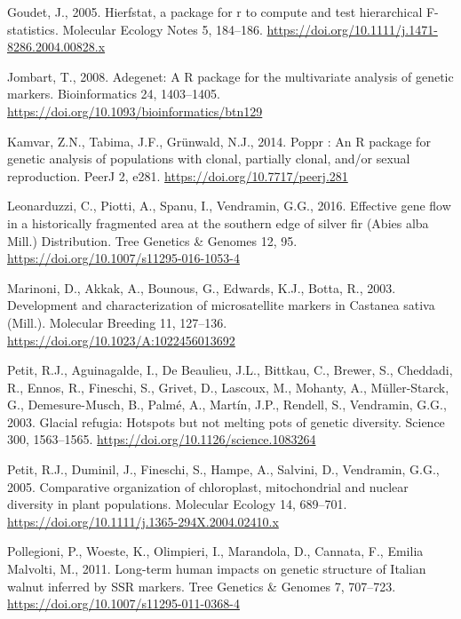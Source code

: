 \documentclass[12pt,a4paper,]{report}
\begin{document}
\hypertarget{refs}{}
\leavevmode\hypertarget{ref-goudet_hierfstat_2005}{}%
Goudet, J., 2005. Hierfstat, a package for r to compute and test
hierarchical F-statistics. Molecular Ecology Notes 5, 184--186.
\url{https://doi.org/10.1111/j.1471-8286.2004.00828.x}

\leavevmode\hypertarget{ref-Jombart2008}{}%
Jombart, T., 2008. Adegenet: A R package for the multivariate analysis
of genetic markers. Bioinformatics 24, 1403--1405.
\url{https://doi.org/10.1093/bioinformatics/btn129}

\leavevmode\hypertarget{ref-Kamvar2014}{}%
Kamvar, Z.N., Tabima, J.F., Grünwald, N.J., 2014. Poppr : An R package
for genetic analysis of populations with clonal, partially clonal,
and/or sexual reproduction. PeerJ 2, e281.
\url{https://doi.org/10.7717/peerj.281}

\leavevmode\hypertarget{ref-Leonarduzzi2016a}{}%
Leonarduzzi, C., Piotti, A., Spanu, I., Vendramin, G.G., 2016. Effective
gene flow in a historically fragmented area at the southern edge of
silver fir (Abies alba Mill.) Distribution. Tree Genetics \& Genomes 12,
95. \url{https://doi.org/10.1007/s11295-016-1053-4}

\leavevmode\hypertarget{ref-marinoni_development_2003}{}%
Marinoni, D., Akkak, A., Bounous, G., Edwards, K.J., Botta, R., 2003.
Development and characterization of microsatellite markers in Castanea
sativa (Mill.). Molecular Breeding 11, 127--136.
\url{https://doi.org/10.1023/A:1022456013692}

\leavevmode\hypertarget{ref-Petit2003}{}%
Petit, R.J., Aguinagalde, I., De Beaulieu, J.L., Bittkau, C., Brewer,
S., Cheddadi, R., Ennos, R., Fineschi, S., Grivet, D., Lascoux, M.,
Mohanty, A., Müller-Starck, G., Demesure-Musch, B., Palmé, A., Martín,
J.P., Rendell, S., Vendramin, G.G., 2003. Glacial refugia: Hotspots but
not melting pots of genetic diversity. Science 300, 1563--1565.
\url{https://doi.org/10.1126/science.1083264}

\leavevmode\hypertarget{ref-Petit2005}{}%
Petit, R.J., Duminil, J., Fineschi, S., Hampe, A., Salvini, D.,
Vendramin, G.G., 2005. Comparative organization of chloroplast,
mitochondrial and nuclear diversity in plant populations. Molecular
Ecology 14, 689--701.
\url{https://doi.org/10.1111/j.1365-294X.2004.02410.x}

\leavevmode\hypertarget{ref-Pollegioni2011}{}%
Pollegioni, P., Woeste, K., Olimpieri, I., Marandola, D., Cannata, F.,
Emilia Malvolti, M., 2011. Long-term human impacts on genetic structure
of Italian walnut inferred by SSR markers. Tree Genetics \& Genomes 7,
707--723. \url{https://doi.org/10.1007/s11295-011-0368-4}
\end{document}
